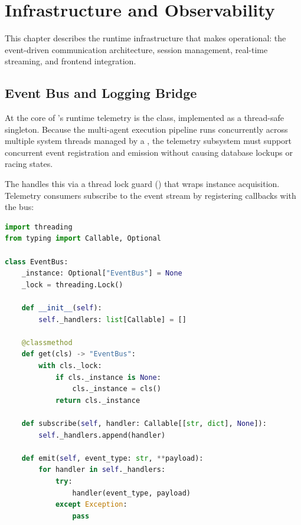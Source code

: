 \chapter{Infrastructure and Observability}
\label{ch:infrastructure}

This chapter describes the runtime infrastructure that makes \versimux{} operational: the event-driven communication architecture, session management, real-time streaming, and frontend integration.


\section{Event Bus and Logging Bridge}
\label{sec:event-bus}

At the core of \versimux{}'s runtime telemetry is the  class, implemented as a thread-safe singleton. Because the multi-agent execution pipeline runs concurrently across multiple system threads managed by a , the telemetry subsystem must support concurrent event registration and emission without causing database lockups or racing states. 

The  handles this via a thread lock guard () that wraps instance acquisition. Telemetry consumers subscribe to the event stream by registering callbacks with the bus:

\begin{lstlisting}[language=Python, caption={Thread-Safe EventBus Implementation (core/event\_bus.py).}]
import threading
from typing import Callable, Optional

class EventBus:
    _instance: Optional["EventBus"] = None
    _lock = threading.Lock()
    
    def __init__(self):
        self._handlers: list[Callable] = []
    
    @classmethod
    def get(cls) -> "EventBus":
        with cls._lock:
            if cls._instance is None:
                cls._instance = cls()
            return cls._instance
    
    def subscribe(self, handler: Callable[[str, dict], None]):
        self._handlers.append(handler)
    
    def emit(self, event_type: str, **payload):
        for handler in self._handlers:
            try:
                handler(event_type, payload)
            except Exception:
                pass
\end{lstlisting}

